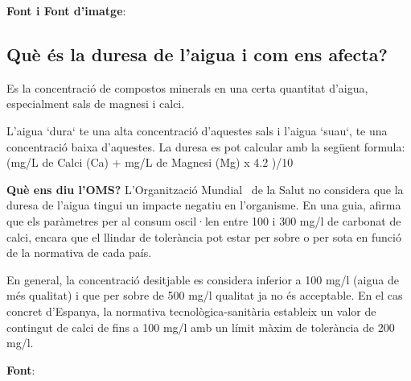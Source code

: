 \textbf{Font i Font d'imatge}: \cite{PH}

\subsection{Què és la duresa de l’aigua i com ens afecta?} \label{subsec:duresa}
Es la concentració de compostos minerals en una certa quantitat d'aigua, especialment sals de magnesi i calci.

L'aigua `dura` te una alta concentració d'aquestes sals i l'aigua `suau`, te una concentració baixa d'aquestes. La duresa es pot calcular amb la següent formula: (mg/L de Calci (Ca) + mg/L de Magnesi (Mg) x 4.2 )/10


\textbf{Què ens diu l'OMS?} L'Organització Mundial~\cite{OrgaMS} de la Salut no considera que la duresa de l'aigua tingui un impacte negatiu en l'organisme. En una guia, afirma que els paràmetres per al consum oscil·len entre 100 i 300 mg/l de carbonat de calci, encara que el llindar de tolerància pot estar per sobre o per sota en funció de la normativa de cada país.

En general, la concentració desitjable es considera inferior a 100 mg/l (aigua de més qualitat) i que per sobre de 500 mg/l qualitat ja no és acceptable. En el cas concret d'Espanya, la normativa tecnològica-sanitària estableix un valor de contingut de calci de fins a 100 mg/l amb un límit màxim de tolerància de 200 mg/l.

\textbf{Font}: \cite{Fasca}
%


